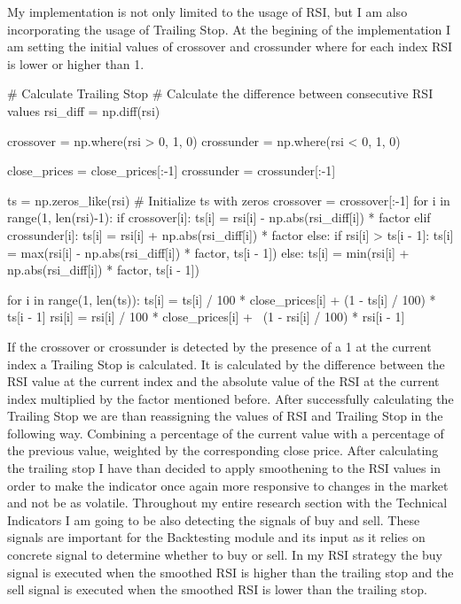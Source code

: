 \documentclass{imc-inf}
\begin{document}
	My implementation is not only limited to the usage of RSI, but I am also incorporating the usage of Trailing Stop.
	At the begining of the implementation I am setting the initial values of crossover and crossunder where for each index RSI is lower or higher than 1.
	\begin{code}[language=Python, caption={Trailing Stop Implementation}]
		# Calculate Trailing Stop
		# Calculate the difference between consecutive RSI values
		rsi_diff = np.diff(rsi)
		
		crossover = np.where(rsi > 0, 1, 0)
		crossunder = np.where(rsi < 0, 1, 0)
		
		close_prices = close_prices[:-1]
		crossunder = crossunder[:-1]
		
		ts = np.zeros_like(rsi)  # Initialize ts with zeros
		crossover = crossover[:-1]
		for i in range(1, len(rsi)-1):
		if crossover[i]:
		ts[i] = rsi[i] - np.abs(rsi_diff[i]) * factor
		elif crossunder[i]:
		ts[i] = rsi[i] + np.abs(rsi_diff[i]) * factor
		else:
		if rsi[i] > ts[i - 1]:
		ts[i] = max(rsi[i] - np.abs(rsi_diff[i]) * factor, ts[i - 1])
		else:
		ts[i] = min(rsi[i] + np.abs(rsi_diff[i]) * factor, ts[i - 1])
		
		for i in range(1, len(ts)):
		ts[i] = ts[i] / 100 * close_prices[i] + (1 - ts[i] / 100) * ts[i - 1]
		rsi[i] = rsi[i] / 100 * close_prices[i] + \
		(1 - rsi[i] / 100) * rsi[i - 1]
	\end{code}
	If the crossover or crossunder is detected by the presence of a 1 at the current index a Trailing Stop is calculated. It is calculated by
	the difference between the RSI value at the current index and the absolute value of the RSI at the current index multiplied by the factor mentioned before.
	After successfully calculating the Trailing Stop we are than reassigning the values of RSI and Trailing Stop in the following way. Combining a 
	percentage of the current value with a percentage of the previous value, weighted by the corresponding close price.
	After calculating the trailing stop I have than decided to apply smoothening to the RSI values in order to make the indicator once again
	more responsive to changes in the market and not be as volatile.
	Throughout my entire research section with the Technical Indicators I am going to be also detecting the signals of buy and sell.
	These signals are important for the Backtesting module and its input as it relies on concrete signal to determine whether to buy or sell.
	In my RSI strategy the buy signal is executed when the smoothed RSI is higher than the trailing stop and the sell signal is executed when the
	smoothed RSI is lower than the trailing stop. 
\end{document}
